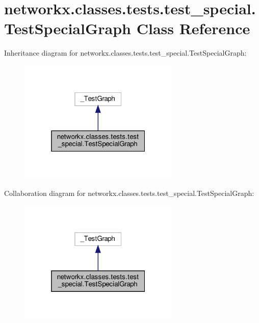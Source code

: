 \hypertarget{classnetworkx_1_1classes_1_1tests_1_1test__special_1_1TestSpecialGraph}{}\section{networkx.\+classes.\+tests.\+test\+\_\+special.\+Test\+Special\+Graph Class Reference}
\label{classnetworkx_1_1classes_1_1tests_1_1test__special_1_1TestSpecialGraph}


Inheritance diagram for networkx.\+classes.\+tests.\+test\+\_\+special.\+Test\+Special\+Graph\+:
\nopagebreak
\begin{figure}[H]
\begin{center}
\leavevmode
\includegraphics[width=217pt]{classnetworkx_1_1classes_1_1tests_1_1test__special_1_1TestSpecialGraph__inherit__graph}
\end{center}
\end{figure}


Collaboration diagram for networkx.\+classes.\+tests.\+test\+\_\+special.\+Test\+Special\+Graph\+:
\nopagebreak
\begin{figure}[H]
\begin{center}
\leavevmode
\includegraphics[width=217pt]{classnetworkx_1_1classes_1_1tests_1_1test__special_1_1TestSpecialGraph__coll__graph}
\end{center}
\end{figure}
